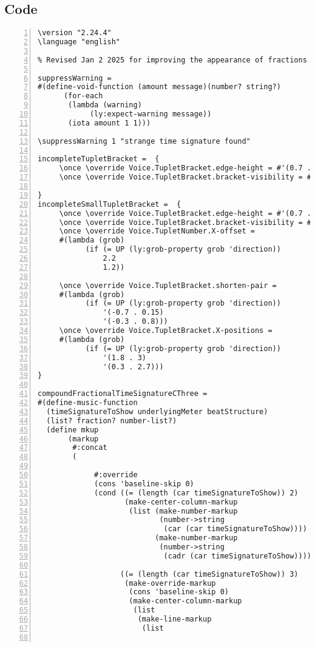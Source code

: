 \subsection{Code}
\begin{Verbatim}[numbers=left,xleftmargin=5mm]
\version "2.24.4"
\language "english"

% Revised Jan 2 2025 for improving the appearance of fractions

suppressWarning =
#(define-void-function (amount message)(number? string?)
      (for-each
       (lambda (warning)
            (ly:expect-warning message))
       (iota amount 1 1)))

\suppressWarning 1 "strange time signature found"

incompleteTupletBracket =  {
     \once \override Voice.TupletBracket.edge-height = #'(0.7 . 0)
     \once \override Voice.TupletBracket.bracket-visibility = ##t

}
incompleteSmallTupletBracket =  {
     \once \override Voice.TupletBracket.edge-height = #'(0.7 . 0)
     \once \override Voice.TupletBracket.bracket-visibility = ##t
     \once \override Voice.TupletNumber.X-offset =
     #(lambda (grob)
           (if (= UP (ly:grob-property grob 'direction))
               2.2
               1.2))

     \once \override Voice.TupletBracket.shorten-pair =
     #(lambda (grob)
           (if (= UP (ly:grob-property grob 'direction))
               '(-0.7 . 0.15)
               '(-0.3 . 0.8)))
     \once \override Voice.TupletBracket.X-positions =
     #(lambda (grob)
           (if (= UP (ly:grob-property grob 'direction))
               '(1.8 . 3)
               '(0.3 . 2.7)))
}

compoundFractionalTimeSignatureCThree =
#(define-music-function
  (timeSignatureToShow underlyingMeter beatStructure)
  (list? fraction? number-list?)
  (define mkup
       (markup
        #:concat
        (

             #:override
             (cons 'baseline-skip 0)
             (cond ((= (length (car timeSignatureToShow)) 2)
                    (make-center-column-markup
                     (list (make-number-markup
                            (number->string
                             (car (car timeSignatureToShow))))
                           (make-number-markup
                            (number->string
                             (cadr (car timeSignatureToShow)))))))

                   ((= (length (car timeSignatureToShow)) 3)
                    (make-override-markup
                     (cons 'baseline-skip 0)
                     (make-center-column-markup
                      (list
                       (make-line-markup
                        (list


\end{Verbatim}
